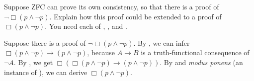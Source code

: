 \begin{exercise}
  Suppose ZFC can prove its own consistency, so that there is a proof of
  $\neg \Box (p \land \neg p)$. Explain how this proof could be extended to a
  proof of $\Box (p \land \neg p)$. You need
  each of , , and .
\end{exercise}
\begin{solution}
  Suppose there is a proof of $\neg\Box (p \land \neg p)$. By , we can
  infer $\Box (p \land \neg p) \to (p \land \neg p)$, because $A \to B$ is a
  truth-functional consequence of $\neg A$. By , we get
  $\Box (\Box (p \land \neg p) \to (p \land \neg p))$. By  and
  \emph{modus ponens} (an instance of ), we can derive
  $\Box (p \land \neg p)$.
\end{solution}


%
%

